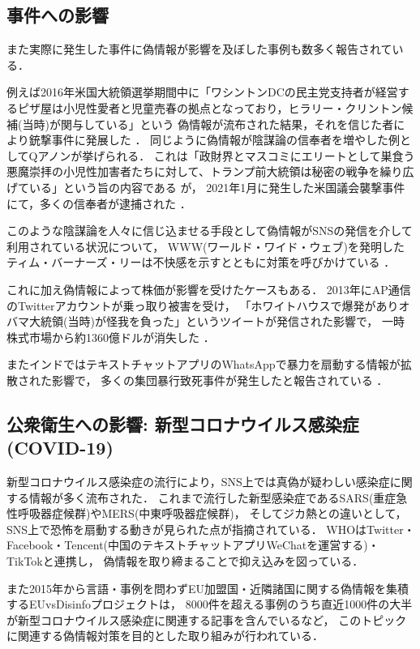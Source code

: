 \subsection{事件への影響}
また実際に発生した事件に偽情報が影響を及ぼした事例も数多く報告されている．

例えば2016年米国大統領選挙期間中に「ワシントンDCの民主党支持者が経営するピザ屋は小児性愛者と児童売春の拠点となっており，ヒラリー・クリントン候補(当時)が関与している」という
偽情報が流布された結果，それを信じた者により銃撃事件に発展した \cite{agencies_2016}．
同じように偽情報が陰謀論の信奉者を増やした例としてQアノンが挙げられる．
これは「政財界とマスコミにエリートとして巣食う悪魔崇拝の小児性加害者たちに対して、トランプ前大統領は秘密の戦争を繰り広げている」という旨の内容である \cite{wendling_2021}が，
2021年1月に発生した米国議会襲撃事件にて，多くの信奉者が逮捕された \cite{hymes_mcdonald_watson_2021}．

このような陰謀論を人々に信じ込ませる手段として偽情報がSNSの発信を介して利用されている状況について，
WWW(ワールド・ワイド・ウェブ)を発明したティム・バーナーズ・リーは不快感を示すとともに対策を呼びかけている \cite{reklaitis_2018}．

これに加え偽情報によって株価が影響を受けたケースもある．
2013年にAP通信のTwitterアカウントが乗っ取り被害を受け，
「ホワイトハウスで爆発がありオバマ大統領(当時)が怪我を負った」というツイートが発信された影響で，
一時株式市場から約1360億ドルが消失した \cite{fisher_2013}．

またインドではテキストチャットアプリのWhatsAppで暴力を扇動する情報が拡散された影響で，
多くの集団暴行致死事件が発生したと報告されている \cite{frayer_2018}．

\subsection{公衆衛生への影響: 新型コロナウイルス感染症(COVID-19)}
新型コロナウイルス感染症の流行により，SNS上では真偽が疑わしい感染症に関する情報が多く流布された．
これまで流行した新型感染症であるSARS(重症急性呼吸器症候群)やMERS(中東呼吸器症候群)，
そしてジカ熱との違いとして，SNS上で恐怖を扇動する動きが見られた点が指摘されている．
WHOはTwitter・Facebook・Tencent(中国のテキストチャットアプリWeChatを運営する)・TikTokと連携し，
偽情報を取り締まることで抑え込みを図っている\cite{hao_2020}．

また2015年から言語・事例を問わずEU加盟国・近隣諸国に関する偽情報を集積するEUvsDisinfoプロジェクト\cite{euvsdisinfo_2020}は，
8000件を超える事例のうち直近1000件の大半が新型コロナウイルス感染症に関連する記事を含んでいる\cite{euvsdisinfo_2020_2}など，
このトピックに関連する偽情報対策を目的とした取り組みが行われている．

